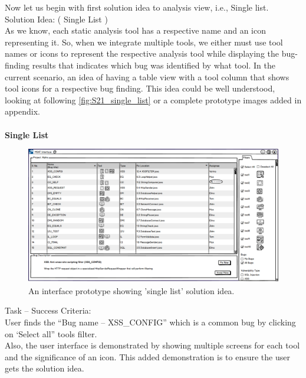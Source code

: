 Now let us begin with first solution idea to analysis view, i.e., Single list. \\

Solution Idea: ( Single List ) \\

As we know, each static analysis tool has a respective name and an icon representing it. So, when we integrate multiple tools, we either must use tool names or icons to represent the respective analysis tool while displaying the bug-finding results that indicates which bug was identified by what tool. In the current scenario, an idea of having a table view with a tool column that shows tool icons for a respective bug finding. This idea could be well understood, looking at following  \autoref{fig:S21_single_list} or a complete prototype images added in appendix. \\ \\
\clearpage
\textbf{Single List}
\begin{figure}[hbt!]
	\centering
	\includegraphics[width=\linewidth]{figures/solution_ideas_snaps/S21_single_list}
	\caption{An interface prototype showing 'single list' solution idea.}
	\label{fig:S21_single_list}
\end{figure} 

Task – Success Criteria: \\

User finds the “Bug name – XSS\_CONFIG” which is a common bug by clicking on ‘Select all” tools filter. \\

Also, the user interface is demonstrated by showing multiple screens for each tool and the significance of an icon. This added demonstration is to ensure the user gets the solution idea. \\ \\

